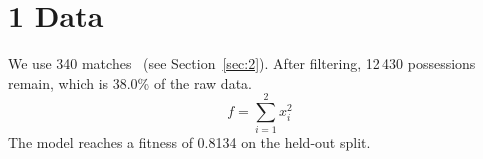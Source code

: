 \documentclass{article}
\begin{document}
\begin{abstract}
We study 340 matches from the 2019 season. The method reaches 0.81 fitness and keeps 38\% of the
possessions, 12,430 in total.
\end{abstract}
\section{1 Data}
We use 340 matches~\cite{ref2020} (see Section~\ref{sec:2}).
After filtering, 12\,430 possessions remain, which is 38.0\% of the raw data.
\begin{equation}
  f = \sum_{i=1}^{2} x_i^2
\end{equation}
The model reaches a fitness of 0.8134 on the held-out split.
\end{document}
